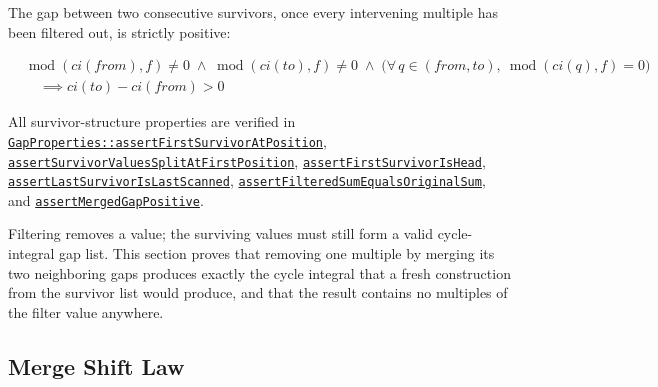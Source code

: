 The gap between two consecutive survivors, once every intervening multiple
has been filtered out, is strictly positive:

\begin{equation*}
\begin{aligned}
&\operatorname{mod}(ci(from), f) \neq 0 \;\land\; \operatorname{mod}(ci(to), f) \neq 0
\;\land\; \big(\forall\, q \in (from, to),\ \operatorname{mod}(ci(q), f) = 0\big) \\
&\quad \implies ci(to) - ci(from) > 0
\end{aligned}
\end{equation*}

{\raggedright
All survivor-structure properties are verified in
\href{https://github.com/thiagomata/prime-numbers/blob/integral-cycle-article-v1.0.0/src/main/scala/v1/chapter4/cycle/integral/recursive/properties/GapProperties.scala}{\texttt{GapProperties::\allowbreak assertFirstSurvivorAtPosition}},
\href{https://github.com/thiagomata/prime-numbers/blob/integral-cycle-article-v1.0.0/src/main/scala/v1/chapter4/cycle/integral/recursive/properties/GapProperties.scala}{\texttt{assertSurvivorValuesSplitAtFirstPosition}},
\href{https://github.com/thiagomata/prime-numbers/blob/integral-cycle-article-v1.0.0/src/main/scala/v1/chapter4/cycle/integral/recursive/properties/GapProperties.scala}{\texttt{assertFirstSurvivorIsHead}},
\href{https://github.com/thiagomata/prime-numbers/blob/integral-cycle-article-v1.0.0/src/main/scala/v1/chapter4/cycle/integral/recursive/properties/GapProperties.scala}{\texttt{assertLastSurvivorIsLastScanned}},
\href{https://github.com/thiagomata/prime-numbers/blob/integral-cycle-article-v1.0.0/src/main/scala/v1/chapter4/cycle/integral/recursive/properties/GapProperties.scala}{\texttt{assertFilteredSumEqualsOriginalSum}},
and
\href{https://github.com/thiagomata/prime-numbers/blob/integral-cycle-article-v1.0.0/src/main/scala/v1/chapter4/cycle/integral/recursive/properties/GapProperties.scala}{\texttt{assertMergedGapPositive}}.
\par}

Filtering removes a value; the surviving values must still form a valid
cycle-integral gap list. This section proves that removing one multiple by
merging its two neighboring gaps produces exactly the cycle integral that
a fresh construction from the survivor list would produce, and that the
result contains no multiples of the filter value anywhere.

\subsection{Merge Shift Law}

